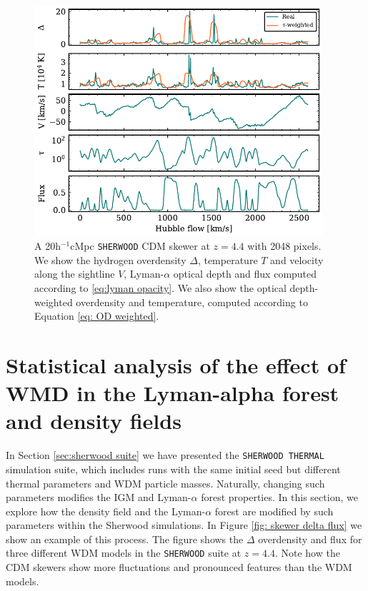 \begin{figure}
        \centering
        \includegraphics[width=0.95\textwidth]{img/ML/Skewer_OD_quantities.pdf}
        \caption{A 20h$^{-1}$cMpc \texttt{SHERWOOD} CDM skewer at $z=4.4$ with 2048 pixels. We show the hydrogen overdensity $\Delta$, temperature $T$ and velocity along the sightline $V$, Lyman-$\alpha$ optical depth and flux computed according to \ref{eq:lyman opacity}. We also show the optical depth-weighted overdensity and temperature, computed according to Equation \ref{eq: OD weighted}.}
        \label{fig: skewer sherwood}     
\end{figure}













\section{Statistical analysis of the effect of WMD in the Lyman-alpha forest and density fields}\label{sec:statistics sher}


In Section \ref{sec:sherwood suite} we have presented the \texttt{SHERWOOD THERMAL} simulation suite, which includes runs with the same initial seed but different thermal parameters and WDM particle masses. Naturally, changing such parameters modifies the IGM and Lyman-$\alpha$ forest properties. In this section, we explore how the density field and the Lyman-$\alpha$ forest are modified by such parameters within the Sherwood simulations. In Figure \ref{fig: skewer delta flux} we show an example of this process. The figure shows the $\Delta$ overdensity and flux for three different WDM models in the \texttt{SHERWOOD} suite at $z=4.4$. Note how the CDM skewers show more fluctuations and pronounced features than the WDM models.

